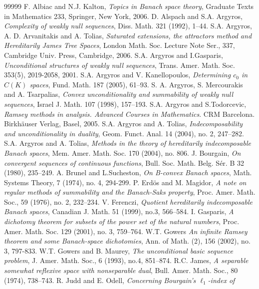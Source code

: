 \documentclass[a4paper]{amsart}
\theoremstyle{plain}
\begin{document}
\begin{thebibliography}{99999}
  F. Albiac and N.J. Kalton, {\sl Topics in Banach space theory}, Graduate Texts in Mathematics 233, Springer, New York, 2006.
 D. Alspach and S.A. Argyros, {\sl Complexity of weakly null
sequences}, Diss. Math. 321 (1992), 1--44.
 S.A. Argyros, A. D. Arvanitakis and A. Tolias, {\sl Saturated
extensions, the attractors method and Hereditarily James Tree
Spaces}, London Math. Soc. Lecture Note Ser., 337, Cambridge Univ. Press,
Cambridge, 2006.
 S.A. Argyros and I.Gasparis, {\sl Unconditional structures of
weakly null sequences}, Trans. Amer. Math. Soc. 353(5), 2019-2058, 2001.
S.A. Argyros and V. Kanellopoulos, {\sl Determining $c_0$ in  $C(K)$ spaces},
Fund. Math. 187 (2005), 61--93.
 S. A. Argyros, S. Mercourakis and A. Tsarpalias, {\sl Convex
unconditionality and summability of weakly null sequences}, Israel J. Math. 107
(1998), 157--193.
 S.A. Argyros and S.Todorcevic, {\sl Ramsey methods in analysis. Advanced Courses in Mathematics}. CRM Barcelona. Birkh\"auser Verlag, Basel, 2005.
 S.A. Argyros and A. Tolias, {\sl Indecomposability and
unconditionality in duality}, Geom. Funct. Anal. 14 (2004), no. 2, 247--282.
 S.A. Argyros and A. Tolias, {\sl Methods in the theory of
hereditarily indecomposable Banach spaces},
Mem. Amer. Math. Soc. 170 (2004), no. 806.
 J. Bourgain, {\sl On convergent sequences of continuous functions},
Bull. Soc. Math. Belg. S\'er. B 32 (1980), 235--249.
 A. Brunel and L.Sucheston, {\sl On B-convex Banach spaces}, Math.
Systems Theory, 7 (1974), no. 4, 294-299.
 P. Erd\"os and M. Magidor, {\sl A note on regular methods of
summability and the Banach-Saks property}, Proc. Amer. Math. Soc.,  59 (1976), no. 2,
232--234.
 V. Ferenczi, {\sl Quotient hereditarily indecomposable Banach
spaces}, Canadian J. Math. 51 (1999), no.3, 566--584.
 I. Gasparis, {\sl A dichotomy theorem for subsets of the power set
of the natural numbers}, Proc. Amer. Math. Soc. 129 (2001), no. 3, 759--764.
 W.T. Gowers {\sl An infinite Ramsey theorem and some Banach-space
dichotomies},  Ann. of Math. (2), 156 (2002), no. 3, 797-833.
W.T. Gowers and B. Maurey, {\sl The unconditional basic sequence
problem}, J. Amer. Math. Soc., 6 (1993), no.4, 851--874.
R.C. James,  {\sl A separable somewhat reflexive space with nonseparable dual},
Bull. Amer. Math. Soc.,  80 (1974), 738--743.
 R. Judd and E. Odell, {\sl Concerning Bourgain's $\ell_{1}$-index of
}
\end{thebibliography}
\end{document}
